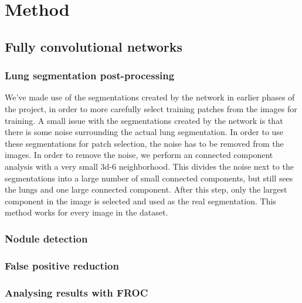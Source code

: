 \documentclass{article}
\begin{document}
\section{Method}\label{sec:method} 
\subsection{Fully convolutional networks}
\subsubsection{Lung segmentation post-processing}
We've made use of the segmentations created by the network in earlier phases of the project, in order to more carefully select training patches from the images for training. A small issue with the segmentations created by the network is that there is some noise surrounding the actual lung segmentation. In order to use these segmentations for patch selection, the noise has to be removed from the images. In order to remove the noise, we perform an connected component analysis with a very small 3d-6 neighborhood. This divides the noise next to the segmentations into a large number of small connected components, but still sees the lungs and one large connected component. After this step, only the largest component in the image is selected and used as the real segmentation. This method works for every image in the dataset.
\cite{long}

\subsubsection{Nodule detection}
\label{sec:fcn}


\subsubsection{False positive reduction}

\subsubsection{Analysing results with FROC}
\end{document}
